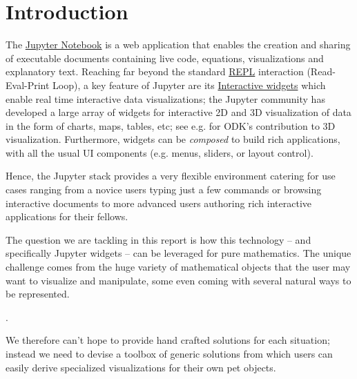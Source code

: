 \documentclass{deliverablereport}
\author{Odile Benassy and Nicolas M. Thiéry}
\begin{document}
\maketitle
\githubissuedescription

\section{Introduction}


The \href{https://jupyter.org}{Jupyter Notebook} is a web application
that enables the creation and sharing of executable documents
containing live code, equations, visualizations and explanatory text.
Reaching far beyond the standard
\href{https://en.wikipedia.org/wiki/Read-eval-print_loop}{REPL}
interaction (Read-Eval-Print Loop), a key feature of Jupyter are its
\href{http://jupyter.org/widgets}{Interactive widgets} which enable
real time interactive data visualizations; the Jupyter community has
developed a large array of widgets for interactive 2D and 3D
visualization of data in the form of charts, maps, tables, etc; see
e.g.  for ODK's contribution to 3D visualization.
Furthermore, widgets can be \emph{composed} to build rich
applications, with all the usual UI components (e.g. menus, sliders,
or layout control).


Hence, the Jupyter stack provides a very flexible environment catering
for use cases ranging from a novice users typing just a few commands
or browsing interactive documents to more advanced users authoring
rich interactive applications for their fellows.

The question we are tackling in this report is how this technology --
and specifically Jupyter widgets -- can be leveraged for pure
mathematics. The unique challenge comes from the huge variety of
mathematical objects that the user may want to visualize and
manipulate, some even coming with several natural ways to be
represented.

.

We therefore can't hope to provide hand crafted solutions for each
situation; instead we need to devise a toolbox of generic solutions
from which users can easily derive specialized visualizations for
their own pet objects.
\end{document}

